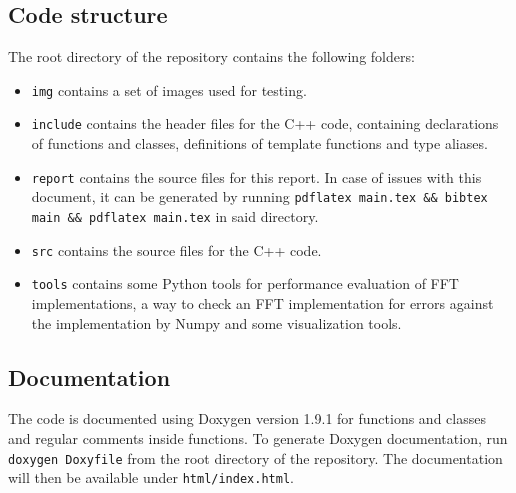 \subsection{Code structure}
The root directory of the repository contains the following folders:
\begin{itemize}
    \item \texttt{img} contains a set of images used for testing.
    \item \texttt{include} contains the header files for the C++ code, containing declarations of functions and classes, definitions of template functions and type aliases.
    \item \texttt{report} contains the source files for this report. In case of issues with this document, it can be generated by running \texttt{pdflatex main.tex \&\& bibtex main \&\& pdflatex main.tex} in said directory.
    \item \texttt{src} contains the source files for the C++ code.
    \item \texttt{tools} contains some Python tools for performance evaluation of FFT implementations, a way to check an FFT implementation for errors against the implementation by Numpy and some visualization tools.
\end{itemize}

\subsection{Documentation}
The code is documented using Doxygen version 1.9.1 for functions and classes and regular comments inside functions. To generate Doxygen documentation, run \texttt{doxygen Doxyfile} from the root directory of the repository. The documentation will then be available under \texttt{html/index.html}.